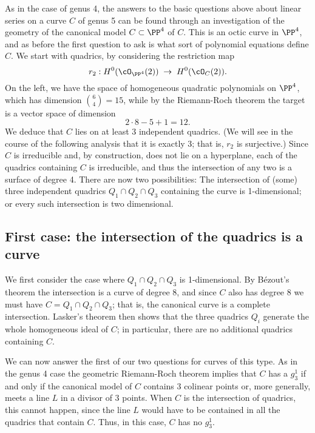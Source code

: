 As in the  case of genus 4, the answers to the basic questions above about linear series on a curve $C$ of genus 5 can be found through an investigation of the geometry of the canonical model $C \subset \PP^4$ of $C$. This is an octic curve in $\PP^4$, and as before the first question to ask is what sort of polynomial equations define $C$. We start with quadrics, by considering the restriction map
$$
r_2 : H^0(\cO_{\PP^4}(2)) \; \to \; H^0(\cO_{C}(2)).
$$
On the left, we have the space of homogeneous quadratic polynomials on $\PP^4$, which has dimension $\binom{6}{4} = 15$, while by the Riemann-Roch theorem the target is a vector space of dimension
$$
2\cdot8 - 5 + 1 = 12.
$$
We deduce that $C$ lies on at least 3 independent quadrics. (We will see in the course of the following analysis that it is exactly 3; that is, $r_2$ is surjective.) Since $C$ is irreducible and, by construction, does not lie on a hyperplane, each of the quadrics containing $C$ is irreducible, and thus the intersection of any two is a surface of degree 4. There are now two possibilities:  The intersection of (some) three independent  quadrics $Q_1 \cap Q_2 \cap Q_3$ containing the curve is 1-dimensional; or every such intersection is two dimensional. 

\subsection{First case: the intersection of the quadrics is a curve}\label{non-trigonal genus 5}

We first consider the case where $Q_1 \cap Q_2 \cap Q_3$ is 1-dimensional.  By B\'ezout's theorem the intersection is a curve of degree 8, and since $C$ also has degree 8 we must have $C=Q_1 \cap Q_2 \cap Q_3$; that is, the canonical curve is a complete intersection. Lasker's theorem then shows that the three quadrics $Q_i$ generate the whole homogeneous ideal of $C$; in particular, there are no additional quadrics containing $C$.

We can now answer the first of our two questions for curves of this type. As in the genus 4 case the geometric Riemann-Roch theorem implies that $C$ has a $g^1_3$ if and only if the canonical model of $C$ contains 3 colinear points or, more generally, meets a line $L$ in a divisor of 3 points. When $C$ is the intersection of quadrics, this cannot happen, since the line $L$ would have to be contained in all the quadrics that contain $C$. Thus, in this case, 
$C$ has no $g^1_3$.


